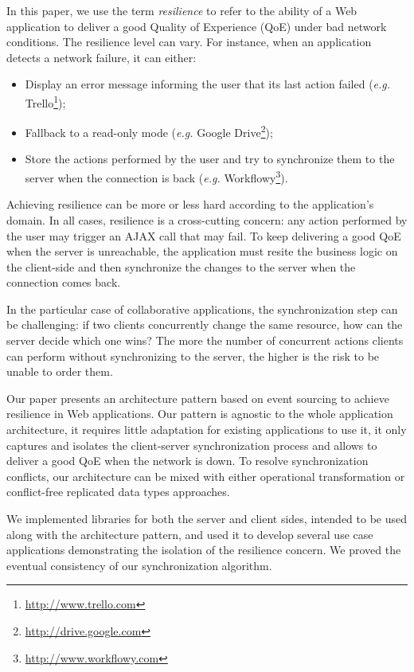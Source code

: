 \documentclass{acm_proc_article-sp}
\begin{document}
In this paper, we use the term \textit{resilience} to refer to the ability of a Web application to deliver a good Quality of Experience (QoE) under bad network conditions. The resilience level can vary. For instance, when an application detects a network failure, it can either:

\begin{itemize}
 \item Display an error message informing the user that its last action failed (\textit{e.g.} Trello\footnote{\href{http://www.trello.com}{http://www.trello.com}});
 \item Fallback to a read-only mode (\textit{e.g.} Google Drive\footnote{\href{http://drive.google.com}{http://drive.google.com}});
 \item Store the actions performed by the user and try to synchronize them to the server when the connection is back (\textit{e.g.} Workflowy\footnote{\href{http://www.workflowy.com}{http://www.workflowy.com}}).
\end{itemize}

Achieving resilience can be more or less hard according to the application’s domain. In all cases, resilience is a cross-cutting concern: any action performed by the user may trigger an AJAX call that may fail. To keep delivering a good QoE when the server is unreachable, the application must resite the business logic on the client-side and then synchronize the changes to the server when the connection comes back.

In the particular case of collaborative applications, the synchronization step can be challenging: if two clients concurrently change the same resource, how can the server decide which one wins? The more the number of concurrent actions clients can perform without synchronizing to the server, the higher is the risk to be unable to order them.

Our paper presents an architecture pattern based on event sourcing to achieve resilience in Web applications. Our pattern is agnostic to the whole application architecture, it requires little adaptation for existing applications to use it, it only captures and isolates the client-server synchronization process and allows to deliver a good QoE when the network is down. To resolve synchronization conflicts, our architecture can be mixed with either operational transformation or conflict-free replicated data types approaches.

We implemented libraries for both the server and client sides, intended to be used along with the architecture pattern, and used it to develop several use case applications demonstrating the isolation of the resilience concern. We proved the eventual consistency of our synchronization algorithm.
\end{document}
